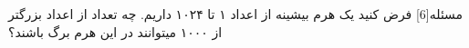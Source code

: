 
‌مسئله[6]
فرض کنید یک هرم بیشینه از اعداد ۱ تا ۱۰۲۴ داریم.  چه تعداد از اعداد بزرگتر از ۱۰۰۰ میتوانند در این هرم برگ باشند؟













